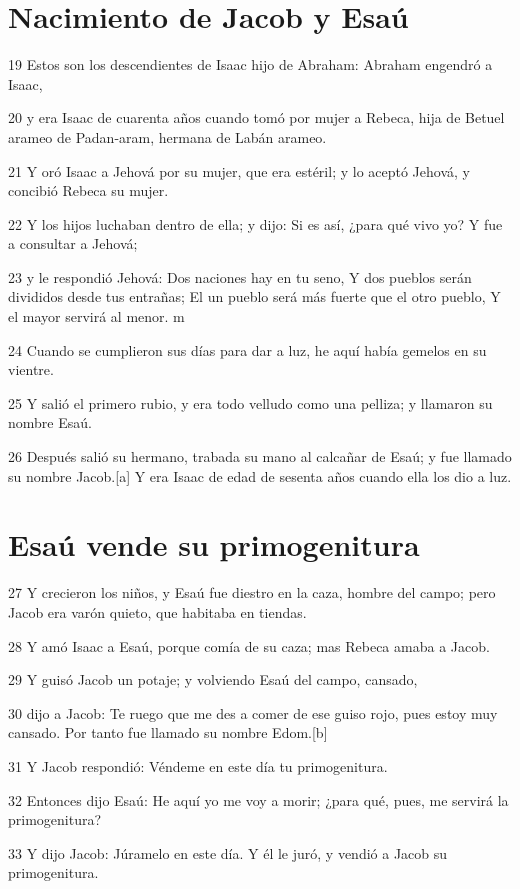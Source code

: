 \section{Nacimiento de Jacob y Esaú}

19 Estos son los descendientes de Isaac hijo de Abraham: Abraham engendró a Isaac,

20 y era Isaac de cuarenta años cuando tomó por mujer a Rebeca, hija de Betuel arameo de Padan-aram, hermana de Labán arameo.

21 Y oró Isaac a Jehová por su mujer, que era estéril; y lo aceptó Jehová, y concibió Rebeca su mujer.

22 Y los hijos luchaban dentro de ella; y dijo: Si es así, ¿para qué vivo yo? Y fue a consultar a Jehová;

23 y le respondió Jehová:
    Dos naciones hay en tu seno,
    Y dos pueblos serán divididos desde tus entrañas;
    El un pueblo será más fuerte que el otro pueblo,
    Y el mayor servirá al menor. m

24 Cuando se cumplieron sus días para dar a luz, he aquí había gemelos en su vientre.

25 Y salió el primero rubio, y era todo velludo como una pelliza; y llamaron su nombre Esaú.

26 Después salió su hermano, trabada su mano al calcañar de Esaú; y fue llamado su nombre Jacob.[a] Y era Isaac de edad de sesenta años cuando ella los dio a luz.

\section{Esaú vende su primogenitura}

27 Y crecieron los niños, y Esaú fue diestro en la caza, hombre del campo; pero Jacob era varón quieto, que habitaba en tiendas.

28 Y amó Isaac a Esaú, porque comía de su caza; mas Rebeca amaba a Jacob.

29 Y guisó Jacob un potaje; y volviendo Esaú del campo, cansado,

30 dijo a Jacob: Te ruego que me des a comer de ese guiso rojo, pues estoy muy cansado. Por tanto fue llamado su nombre Edom.[b]

31 Y Jacob respondió: Véndeme en este día tu primogenitura.

32 Entonces dijo Esaú: He aquí yo me voy a morir; ¿para qué, pues, me servirá la primogenitura?

33 Y dijo Jacob: Júramelo en este día. Y él le juró, y vendió a Jacob su primogenitura.

